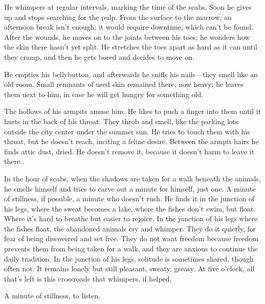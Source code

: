 {He whimpers at regular intervals, marking the time of the scabs.
Soon he gives up and stops searching for the pulp. From the surface to the marrow, an afternoon break isn't enough; it would require downtime, which can't be found.
After the wounds, he moves on to the joints between his toes; he wonders how the skin there hasn't yet split. He stretches the toes apart as hard as it can until they cramp, and then he gets bored and decides to move on.


He empties his bellybutton, and afterwards he sniffs his nails—they smell like an old room.
Small remnants of used skin remained there, now heavy; he leaves them next to him, in case he will get hungry for something old.

The hollows of his armpits amuse him. He likes to push a finger into them until it hurts in the back of his throat. They throb and smell, like the parking lots outside the city center under the summer sun.
He tries to touch them with his throat, but he doesn't reach, inciting a feline desire.
Between the armpit hairs he finds attic dust, dried. He doesn't remove it, because it doesn't harm to leave it there..

In the hour of scabs, when the shadows are taken for a walk beneath the animals, he smells himself and tries to carve out a minute for himself, just one. A minute of stillness, if possible, a minute who doesn’t rush.
He finds it in the junction of his legs, where the sweat becomes a lake, where the fishes don't swim, but float. Where it's hard to breathe but easier to rejoice.
In the junction of his legs where the fishes float, the abandoned animals cry and whimper. They do it quietly, for fear of being discovered and set free. 
They do not want freedom because freedom prevents them from being taken for a walk, and they are anxious to continue the daily tradition.
In the junction of his legs, solitude is sometimes shared, though often not. It remains lonely but still pleasant, sweaty, greasy. At five o'clock, all that's left is this crossroads that whimpers, if helped.

A minute of stillness, to listen.
}

